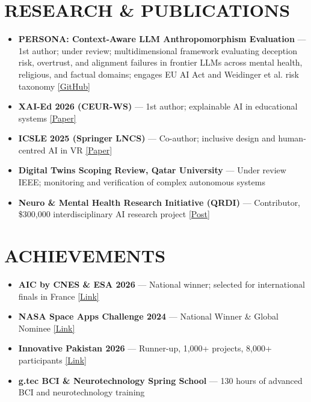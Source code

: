 \documentclass[letterpaper,9pt]{article}
\newcommand{\resumeItem}[1]{
  \item \small{#1}
}
\begin{document}
\section{RESEARCH \& PUBLICATIONS}
\begin{itemize}
\resumeItem{\textbf{PERSONA: Context-Aware LLM Anthropomorphism Evaluation} — 1st author; under review; multidimensional framework evaluating deception risk, overtrust, and alignment failures in frontier LLMs across mental health, religious, and factual domains; engages EU AI Act and Weidinger et al. risk taxonomy \href{https://github.com/92meharali/LLM_Benchmarking_for_Anthromorphism_Computation_for_AIES_paper}{[GitHub]}}
\resumeItem{\textbf{XAI-Ed 2026 (CEUR-WS)} — 1st author; explainable AI in educational systems \href{https://www.xai-ed.net/papers/XAI-Ed_2026_paper_1.pdf}{[Paper]}}
\resumeItem{\textbf{ICSLE 2025 (Springer LNCS)} — Co-author; inclusive design and human-centred AI in VR \href{https://www.researchgate.net/profile/Awais-Baig-3/publication/395837132_Barrier-Based_Inclusive_Design_in_VR_Addressing_DEI_Challenges_through_the_UDL_30_Framework/links/68d55eee220a341aa14f3264/Barrier-Based-Inclusive-Design-in-VR-Addressing-DEI-Challenges-through-the-UDL_30-Framework.pdf}{[Paper]}}
\resumeItem{\textbf{Digital Twins Scoping Review, Qatar University} — Under review IEEE; monitoring and verification of complex autonomous systems}
\resumeItem{\textbf{Neuro \& Mental Health Research Initiative (QRDI)} — Contributor, \$300,000 interdisciplinary AI research project \href{https://www.linkedin.com/feed/update/urn:li:activity:7424050684309917696/}{[Post]}}
\end{itemize}

\section{ACHIEVEMENTS}
\begin{itemize}
\resumeItem{\textbf{AIC by CNES \& ESA 2026} — National winner; selected for international finals in France \href{https://www.linkedin.com/posts/information-technology-university_\%F0\%9D\%97\%9C\%F0\%9D\%97\%A7\%F0\%9D\%97\%A8-\%F0\%9D\%97\%A7\%F0\%9D\%97\%B2\%F0\%9D\%97\%AE\%F0\%9D\%97\%BA-\%F0\%9D\%98\%81\%F0\%9D\%97\%BC-\%F0\%9D\%97\%A5\%F0\%9D\%97\%B2\%F0\%9D\%97\%BD\%F0\%9D\%97\%BF\%F0\%9D\%97\%B2\%F0\%9D\%98\%80\%F0\%9D\%97\%B2\%F0\%9D\%97\%BB\%F0\%9D\%98\%81-\%F0\%9D\%97\%A3\%F0\%9D\%97\%AE\%F0\%9D\%97\%B8\%F0\%9D\%97\%B6\%F0\%9D\%98\%80\%F0\%9D\%97\%B4\%F0\%9D\%97\%AE\%F0\%9D\%97\%BB-activity-7440108338027065344-qhc0}{[Link]}}
\resumeItem{\textbf{NASA Space Apps Challenge 2024} — National Winner \& Global Nominee \href{https://www.spaceappschallenge.org/nasa-space-apps-2024/find-a-team/nebula-galaxar/?tab=details}{[Link]}}
\resumeItem{\textbf{Innovative Pakistan 2026} — Runner-up, 1,000+ projects, 8,000+ participants \href{https://www.linkedin.com/feed/update/urn:li:activity:7470778147882569728/}{[Link]}}
\resumeItem{\textbf{g.tec BCI \& Neurotechnology Spring School} — 130 hours of advanced BCI and neurotechnology training}
\end{itemize}
\end{document}
